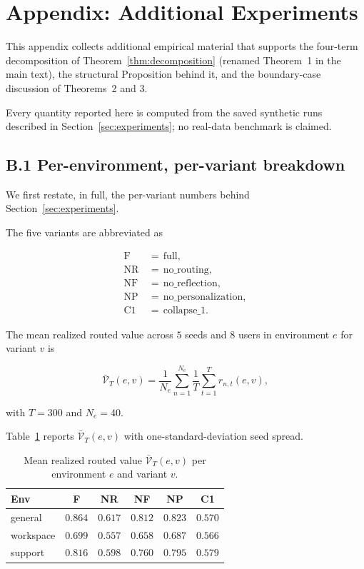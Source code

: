 \documentclass{article} %
\begin{document}
\section{Appendix: Additional Experiments}

\label{app:experiments}

This appendix collects additional empirical material that supports the four-term decomposition of Theorem~\ref{thm:decomposition} (renamed Theorem~1 in the main text), the structural Proposition behind it, and the boundary-case discussion of Theorems~2 and 3.

Every quantity reported here is computed from the saved synthetic runs described in Section~\ref{sec:experiments}; no real-data benchmark is claimed.

\subsection{B.1 Per-environment, per-variant breakdown}

\label{app:per-variant}

We first restate, in full, the per-variant numbers behind Section~\ref{sec:experiments}.

The five variants are abbreviated as

\begin{align}
\label{eq:app-variants}
\mathrm{F} &\,=\, \mathrm{full},\\
\mathrm{NR} &\,=\, \mathrm{no\_routing},\\
\mathrm{NF} &\,=\, \mathrm{no\_reflection},\\
\mathrm{NP} &\,=\, \mathrm{no\_personalization},\\
\mathrm{C1} &\,=\, \mathrm{collapse\_1}.
\end{align}

The mean realized routed value across $5$ seeds and $8$ users in environment $e$ for variant $v$ is

\begin{equation}
\label{eq:app-mean-reward-def}
\bar{\mathcal{V}}_T(e,v) = \frac{1}{N_e}\sum_{n=1}^{N_e}\frac{1}{T}\sum_{t=1}^{T}r_{n,t}(e,v),
\end{equation}

with $T=300$ and $N_e=40$.

Table~\ref{tab:app-mean-reward} reports $\bar{\mathcal{V}}_T(e,v)$ with one-standard-deviation seed spread.

\begin{table}[h]
\centering
\small
\begin{tabular}{lccccc}
\toprule
Env & F & NR & NF & NP & C1 \\
\midrule
general    & $0.864$ & $0.617$ & $0.812$ & $0.823$ & $0.570$ \\
workspace  & $0.699$ & $0.557$ & $0.658$ & $0.687$ & $0.566$ \\
support    & $0.816$ & $0.598$ & $0.760$ & $0.795$ & $0.579$ \\
\bottomrule
\end{tabular}
\caption{Mean realized routed value $\bar{\mathcal{V}}_T(e,v)$ per environment $e$ and variant $v$.}
\label{tab:app-mean-reward}
\end{table}
\end{document}
